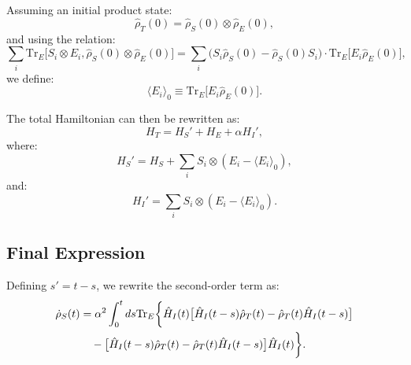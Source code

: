 Assuming an initial product state:
\begin{equation}
    \hat{\rho}_T(0) = \hat{\rho}_S(0) \otimes \hat{\rho}_E(0),
    \label{eq:initial_product_state}
\end{equation}
and using the relation:
\begin{equation}
    \sum_i \mathrm{Tr}_E\big[ S_i \otimes E_i , \hat{\rho}_S(0) \otimes \hat{\rho}_E(0)\big] = \sum_i \big(S_i \hat{\rho}_S(0) - \hat{\rho}_S(0) S_i\big) \cdot \mathrm{Tr}_E \big[E_i \hat{\rho}_E(0)\big],
    \label{eq:trace_relation}
\end{equation}
we define:
\begin{equation}
    \langle E_i \rangle_0 \equiv \mathrm{Tr}_E \big[E_i \hat{\rho}_E(0)\big].
    \label{eq:environment_expectation}
\end{equation}

The total Hamiltonian can then be rewritten as:
\begin{equation}
    H_T = H_S' + H_E + \alpha H_I',
    \label{eq:shifted_hamiltonian}
\end{equation}
where:
\begin{equation}
    H_S' = H_S + \sum_i S_i \otimes (E_i - \langle E_i \rangle_0),
    \label{eq:shifted_system_hamiltonian}
\end{equation}
and:
\begin{equation}
    H_I' = \sum_i S_i \otimes (E_i - \langle E_i \rangle_0).
    \label{eq:shifted_interaction_hamiltonian}
\end{equation}


\subsection{Final Expression}

Defining $s' = t - s$, we rewrite the second-order term as:
\begin{align}
    \dot{\rho}_S(t) &= \alpha^2 \int_0^t ds \mathrm{Tr}_E \bigg\{ 
        \hat{H}_I(t) \big[ \hat{H}_I(t-s) \hat{\rho}_T(t)  - \hat{\rho}_T(t) \hat{H}_I(t-s) \big] \notag \\
        &\quad - \big[ \hat{H}_I(t-s) \hat{\rho}_T(t)  - \hat{\rho}_T(t) \hat{H}_I(t-s) \big] \hat{H}_I(t) 
    \bigg\}.
    \label{eq:final_expression}
\end{align}

